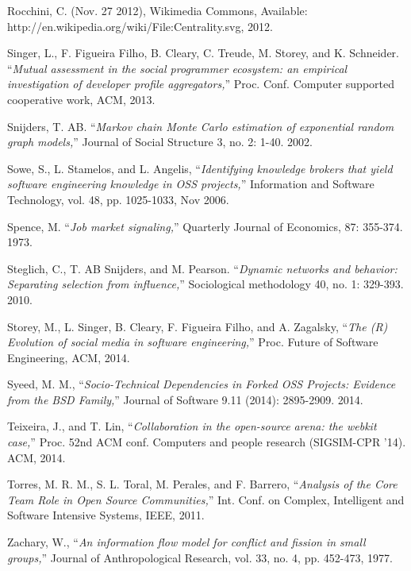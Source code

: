 \begin{thebibliography}{99.}
 Rocchini, C. (Nov. 27 2012), Wikimedia Commons, Available:\\ http://en.wikipedia.org/wiki/File:Centrality.svg, 2012.  

 Singer, L., F. Figueira Filho, B. Cleary, C. Treude, M. Storey, and K. Schneider. ``\textit{Mutual assessment in the social programmer ecosystem: an empirical investigation of developer profile aggregators,}'' Proc. Conf. Computer supported cooperative work, ACM, 2013.

 Snijders, T. AB. ``\textit{Markov chain Monte Carlo estimation of exponential random graph models,}'' Journal of Social Structure 3, no. 2: 1-40. 2002.

 Sowe, S., L. Stamelos, and L. Angelis, ``\textit{Identifying knowledge brokers that yield software engineering knowledge in OSS projects,}'' Information and Software Technology, vol. 48, pp. 1025-1033, Nov 2006. 

 Spence, M. ``\textit{Job market signaling,}'' Quarterly Journal of Economics, 87: 355-374. 1973.

 Steglich, C., T. AB Snijders, and M. Pearson. ``\textit{Dynamic networks and behavior: Separating selection from influence,}'' Sociological methodology 40, no. 1: 329-393. 2010.

 Storey, M., L. Singer, B. Cleary, F. Figueira Filho, and A. Zagalsky, ``\textit{The (R) Evolution of social media in software engineering,}'' Proc. Future of Software Engineering, ACM, 2014.

 Syeed, M. M., ``\textit{Socio-Technical Dependencies in Forked OSS Projects: Evidence from the BSD Family,}'' Journal of Software 9.11 (2014): 2895-2909. 2014.

 Teixeira, J., and T. Lin, ``\textit{Collaboration in the open-source arena: the webkit case,}'' Proc. 52nd ACM conf. Computers and people research (SIGSIM-CPR '14). ACM, 2014.

 Torres, M. R. M., S. L. Toral, M. Perales, and F. Barrero, ``\textit{Analysis of the Core Team Role in Open Source Communities,}'' Int. Conf. on Complex, Intelligent and Software Intensive Systems, IEEE, 2011. 

 Zachary, W., ``\textit{An information flow model for conflict and fission in small groups,}'' Journal of Anthropological Research, vol. 33, no. 4, pp. 452-473, 1977.

\end{thebibliography}
